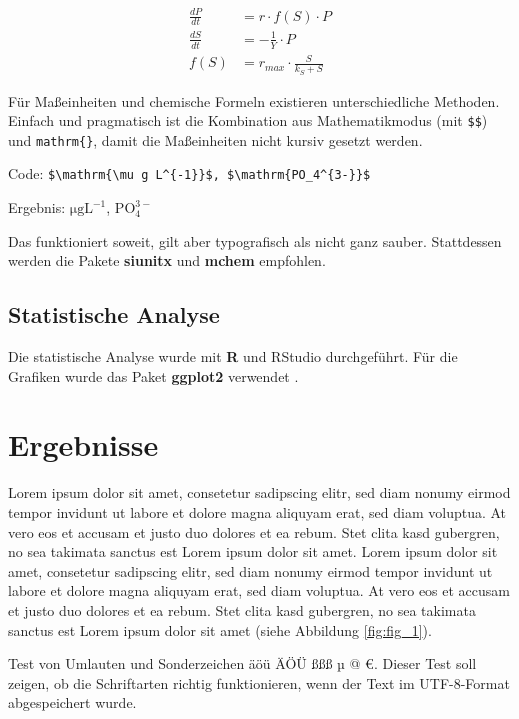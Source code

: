 \documentclass[ngerman,11pt,a4paper]{article}
\begin{document}
\begin{align}
\frac{dP}{dt} &= r \cdot f(S) \cdot P \\
\frac{dS}{dt} &= - \frac{1}{Y} \cdot P \\
f(S) &= r_{max} \cdot \frac{S}{k_S + S}
\end{align}

Für Maßeinheiten und chemische Formeln existieren unterschiedliche Methoden.
Einfach und pragmatisch ist die Kombination aus Mathematikmodus (mit \verb#$$#)
und \verb#mathrm{}#, damit die Maßeinheiten nicht kursiv gesetzt werden.


Code: \verb#$\mathrm{\mu g L^{-1}}$, $\mathrm{PO_4^{3-}}$#

Ergebnis: $\mathrm{\mu g L^{-1}}$, $\mathrm{PO_4^{3-}}$

Das funktioniert soweit, gilt aber typografisch als nicht ganz sauber.
Stattdessen werden die Pakete \textbf{siunitx} und \textbf{mchem} empfohlen.


\subsection{Statistische Analyse}

Die statistische Analyse wurde mit \textbf{R} \parencite{r-core-2024} und RStudio
\parencite{rstudio-2024} durchgeführt. Für die Grafiken
wurde das Paket \textbf{ggplot2} verwendet \parencite{wickham-ggplot2-2016}.


\section{Ergebnisse}

Lorem ipsum dolor sit amet, consetetur sadipscing elitr, sed diam nonumy eirmod
tempor invidunt ut labore et dolore magna aliquyam erat, sed diam voluptua. At
vero eos et accusam et justo duo dolores et ea rebum. Stet clita kasd gubergren,
no sea takimata sanctus est Lorem ipsum dolor sit amet. Lorem ipsum dolor sit
amet, consetetur sadipscing elitr, sed diam nonumy eirmod tempor invidunt ut
labore et dolore magna aliquyam erat, sed diam voluptua. At vero eos et accusam
et justo duo dolores et ea rebum. Stet clita kasd gubergren, no sea takimata
sanctus est Lorem ipsum dolor sit amet (siehe Abbildung \ref{fig:fig_1}).

Test von Umlauten und Sonderzeichen äöü ÄÖÜ ßßß µ @ €. Dieser Test soll zeigen,
ob die Schriftarten richtig funktionieren, wenn der Text im UTF-8-Format
abgespeichert wurde.
\end{document}
